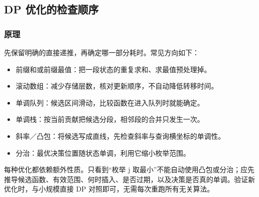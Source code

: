 \subsection{DP 优化的检查顺序}
\label{dp:optimization-basics}
\subsubsection*{原理}

先保留明确的直接递推，再确定哪一部分耗时。常见方向如下：
\begin{itemize}
 \item 前缀和或前缀最值：把一段状态的重复求和、求最值预处理掉。
 \item 滚动数组：减少存储层数，核对更新顺序，不自动降低转移时间。
 \item 单调队列：候选区间滑动，比较函数在进入队列时就能确定。
 \item 单调栈：按当前贡献把候选分段，相邻段的合并只发生一次。
 \item 斜率／凸包：将候选写成直线，先检查斜率与查询横坐标的单调性。
 \item 分治：最优决策位置随状态单调，利用它缩小枚举范围。
\end{itemize}
每种优化都依赖额外性质。只看到“枚举 j 取最小”不能自动使用凸包或分治；应先推导候选函数、有效范围、何时插入、是否过期，以及决策是否真的单调。验证新优化时，与小规模直接 DP 对照即可，无需每次重跑所有无关算法。
